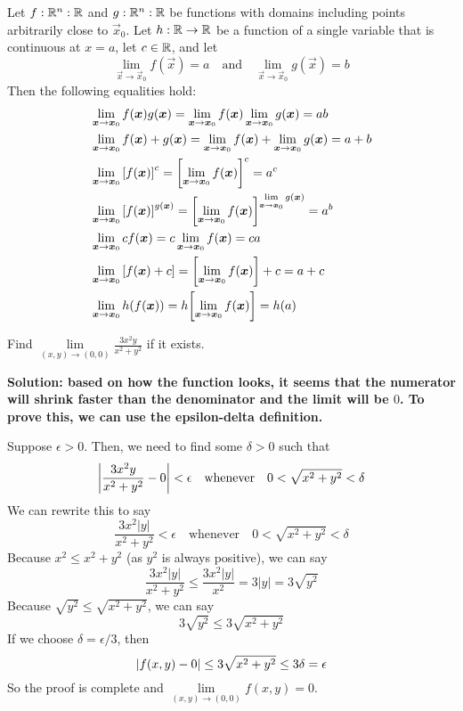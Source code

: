 \begin{theorem}
    Let \(f: \mathbb{R}^n: \mathbb{R}\) and \(g: \mathbb{R}^n: \mathbb{R}\) be functions with domains including points arbitrarily close to \(\vec x_0\). Let \(h: \mathbb{R}\to\mathbb{R}\) be a function of a single variable that is continuous at \(x=a\), let \(c\in\mathbb{R}\), and let
    \[ \lim_{\vec x\to \vec x_0}f(\vec x) = a\quad\text{and}\quad\lim_{\vec x\to\vec x_0}g(\vec x)=b\]
    Then the following equalities hold:
    \begin{align*}
        &\lim_{\vec x \to \vec x_0}f(\vec x)g(\vec x) = \lim_{\vec x \to \vec x_0}f(\vec x)\lim_{\vec x \to \vec x_0}g(\vec x) = ab \\
        &\lim_{\vec x \to \vec x_0}f(\vec x) + g(\vec x)=\lim_{\vec x \to \vec x_0}f(\vec x) + \lim_{\vec x \to \vec x_0}g(\vec x) = a+b \\
        &\lim_{\vec x \to \vec x_0}\bqty{f(\vec x)}^c = \bqty{\lim_{\vec x \to \vec x_0}f(\vec x)}^c = a^c \\
        &\lim_{\vec x \to \vec x_0}\bqty{f(\vec x)}^{g(\vec x)} = \bqty{\lim_{\vec x \to \vec x_0}f(\vec x)}^{\lim\limits_{\vec x \to \vec x_0}g(\vec x)} = a^b \\
        &\lim_{\vec x \to \vec x_0}cf(\vec x) = c\lim_{\vec x \to \vec x_0}f(\vec x) = ca \\
        &\lim_{\vec x \to \vec x_0}\bqty{f(\vec x) + c} = \bqty{\lim_{\vec x \to \vec x_0}f(\vec x)}+c = a+c \\
        &\lim_{\vec x\to \vec x_0}h(f(\vec x)) = h\bqty{\lim_{\vec x\to \vec x_0}f(\vec x)} = h(a)
    \end{align*}
\end{theorem}
\begin{example}
    Find \(\lim\limits_{(x, y)\to(0,0)}\frac{3x^2y}{x^2+y^2}\) if it exists.\par\bf{Solution: }based on how the function looks, it seems that the numerator will shrink faster than the denominator and the limit will be \(0\). To prove this, we can use the epsilon-delta definition.\par Suppose \(\epsilon > 0\). Then, we need to find some \(\delta > 0\) such that 
    \[ \abs{\frac{3x^2y}{x^2+y^2}-0}<\epsilon\quad\text{whenever}\quad 0<\sqrt{x^2+y^2}<\delta \]
    We can rewrite this to say
    \[ \frac{3x^2|y|}{x^2+y^2}<\epsilon\quad\text{whenever}\quad 0<\sqrt{x^2+y^2}<\delta \]
    Because \(x^2\leq x^2+y^2\) (as \(y^2\) is always positive), we can say 
    \[ \frac{3x^2|y|}{x^2+y^2}\leq \frac{3x^2|y|}{x^2} = 3|y| = 3\sqrt{y^2}\]
    Because \(\sqrt{y^2} \leq \sqrt{x^2+y^2}\), we can say
    \[ 3\sqrt{y^2} \leq 3\sqrt{x^2+y^2} \]
    If we choose \(\delta = \epsilon/3\), then
    \[ \abs{f(x, y)-0}\leq 3\sqrt{x^2+y^2}\leq 3\delta = \epsilon\]
    So the proof is complete and \(\lim\limits_{(x,y)\to(0,0)}f(x,y)=0\).
\end{example}
